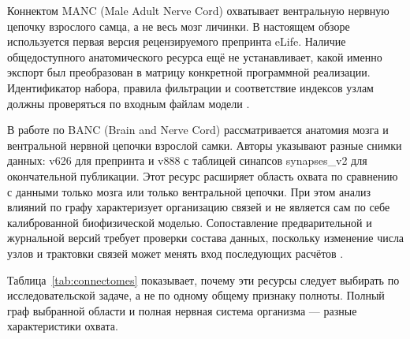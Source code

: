 Коннектом MANC (Male Adult Nerve Cord) охватывает вентральную нервную цепочку взрослого самца, а не весь мозг личинки. В настоящем обзоре используется первая версия рецензируемого препринта eLife. Наличие общедоступного анатомического ресурса ещё не устанавливает, какой именно экспорт был преобразован в матрицу конкретной программной реализации. Идентификатор набора, правила фильтрации и соответствие индексов узлам должны проверяться по входным файлам модели \cite{s774}.

В работе по BANC (Brain and Nerve Cord) рассматривается анатомия мозга и вентральной нервной цепочки взрослой самки. Авторы указывают разные снимки данных: v626 для препринта и v888 с таблицей синапсов synapses\_v2 для окончательной публикации. Этот ресурс расширяет область охвата по сравнению с данными только мозга или только вентральной цепочки. При этом анализ влияний по графу характеризует организацию связей и не является сам по себе калиброванной биофизической моделью. Сопоставление предварительной и журнальной версий требует проверки состава данных, поскольку изменение числа узлов и трактовки связей может менять вход последующих расчётов \cite{s738}.

Таблица~\ref{tab:connectomes} показывает, почему эти ресурсы следует выбирать по исследовательской задаче, а не по одному общему признаку полноты. Полный граф выбранной области и полная нервная система организма --- разные характеристики охвата.

